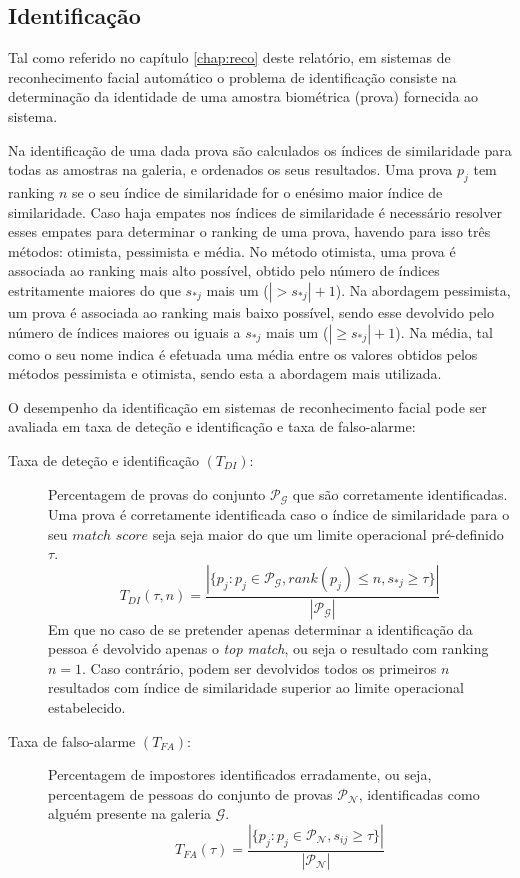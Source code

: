 \subsection{Identificação}
Tal como referido no capítulo \ref{chap:reco} deste relatório, em sistemas de reconhecimento facial automático o problema de identificação consiste na determinação da identidade de uma amostra biométrica (prova) fornecida ao sistema.

Na identificação de uma dada prova são calculados os índices de similaridade para todas as amostras na galeria, e ordenados os seus resultados. Uma prova $p_j$ tem ranking $n$ se o seu índice de similaridade for o enésimo maior índice de similaridade. Caso haja empates nos índices de similaridade é necessário resolver esses empates para determinar o ranking de uma prova, havendo para isso três métodos: otimista, pessimista e média. No método otimista, uma prova é associada ao ranking mais alto possível, obtido pelo número de índices estritamente maiores do que $s_{*j}$ mais um ($|> s_{*j}| + 1$). Na abordagem pessimista, um prova é associada ao ranking mais baixo possível, sendo esse devolvido pelo número de índices maiores ou iguais a $s_{*j}$ mais um ($|\geqslant s_{*j}| + 1$). Na média, tal como o seu nome indica é efetuada uma média entre os valores obtidos pelos métodos pessimista e otimista, sendo esta a abordagem mais utilizada. 

O desempenho da identificação em sistemas de reconhecimento facial pode ser avaliada em taxa de deteção e identificação e taxa de falso-alarme:

 \begin{description}
 \item[Taxa de deteção e identificação $(T_{DI})$:] Percentagem de provas do conjunto $\mathscr{P}_\mathscr{G}$ que são corretamente  identificadas. Uma prova é corretamente identificada caso o índice de similaridade para o seu $match$ $score$ seja seja maior do que um limite operacional pré-definido $\tau$.
\begin{equation}
 T_{DI}(\tau, n) = \frac{|\{p_j:p_j \in \mathscr{P}_\mathscr{G}, rank(p_j) \leqslant n, s_{*j} \geqslant \tau\}|}{|\mathscr{P}_\mathscr{G}|}
\end{equation}
 Em que no caso de se pretender apenas determinar a identificação da pessoa é devolvido apenas o \textit{top match}, ou seja o resultado com ranking $n=1$. Caso contrário, podem ser devolvidos todos os primeiros $n$ resultados com índice de similaridade superior ao limite operacional estabelecido.
 
  \item[Taxa de falso-alarme $(T_{FA})$:] Percentagem de impostores identificados erradamente, ou seja, percentagem de pessoas do conjunto de provas $\mathscr{P}_\mathscr{N}$, identificadas como alguém presente na galeria $\mathscr{G}$.  
\begin{equation}
 T_{FA}(\tau) = \frac{|\{p_j:p_j \in \mathscr{P}_\mathscr{N}, s_{ij} \geqslant \tau\}|}{|\mathscr{P}_\mathscr{N}|}
\end{equation}
\end{description}

